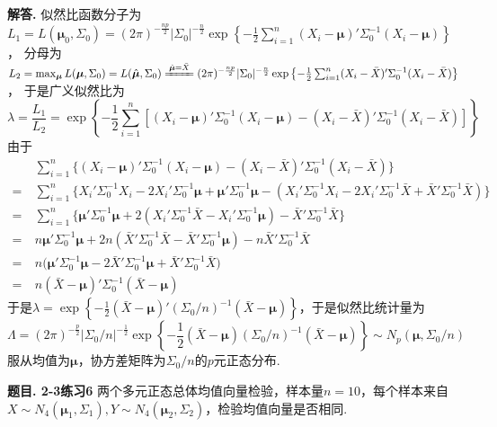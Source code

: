 \documentclass[12pt, a4paper, oneside]{ctexart}
\newcounter{problem}  %
\newenvironment{problem}[1][]{\stepcounter{problem}\par\noindent\textbf{题目\arabic{problem}. #1}}{\smallskip\par}
\newenvironment{solution}[1][]{\par\noindent\textbf{#1解答. }}{\smallskip\par}  %
\def\bd{\boldsymbol}        %
\def\add{\vspace{1ex}}      %
\begin{document}
\begin{solution}
    \add 似然比函数分子为$L_1 = L(\bd{\mu}_0, \Sigma_0) = (2\pi)^{-\frac{np}{2}}|\Sigma_0|^{-\frac{n}{2}}\exp\left\{-\frac{1}{2}\sum_{i=1}^n(X_i-\bd{\mu})'\Sigma_0^{-1}(X_i - \bd{\mu})\right\}$，
    分母为$L_2 = \max_{\bd{\mu}}L(\bd{\mu}, \Sigma_0) = L(\hat{\bd{\mu}}, \Sigma_0) \xlongequal{\hat{\bd{\mu}} = \bar{X}} (2\pi)^{-\frac{np}{2}}|\Sigma_0|^{-\frac{n}{2}}\exp\left\{-\frac{1}{2}\sum_{i=1}^n(X_i-\bar{X})'\Sigma_0^{-1}(X_i - \bar{X})\right\}$，
    于是广义似然比为
    \begin{equation*}
        \lambda = \frac{L_1}{L_2} = \exp\left\{-\frac{1}{2}\sum_{i=1}^n[(X_i-\bd{\mu})'\Sigma_0^{-1}(X_i - \bd{\mu}) - (X_i-\bar{X})'\Sigma_0^{-1}(X_i - \bar{X})]\right\}
    \end{equation*}
    由于
    \begin{align*}
        &\ \sum_{i=1}^n\bigg\{(X_i-\bd{\mu})'\Sigma_0^{-1}(X_i - \bd{\mu}) - (X_i-\bar{X})'\Sigma_0^{-1}(X_i - \bar{X})\bigg\}\\
        =&\ \sum_{i=1}^n\bigg\{X_i'\Sigma_0^{-1}X_i - 2X_i'\Sigma_0^{-1}\bd{\mu} + \bd{\mu}'\Sigma_0^{-1}\bd{\mu} - \left(X_i'\Sigma_0^{-1}X_i-2X_i'\Sigma_0^{-1}\bar{X}+\bar{X}'\Sigma_0^{-1}\bar{X}\right)\bigg\}\\
        =&\ \sum_{i=1}^n\bigg\{\bd{\mu}'\Sigma_0^{-1}\bd{\mu}+2(X_i'\Sigma_0^{-1}\bar{X}-X_i'\Sigma_0^{-1}\bd{\mu})-\bar{X}'\Sigma_0^{-1}\bar{X}\bigg\}\\
        =&\ n\bd{\mu}'\Sigma_0^{-1}\bd{\mu}+2n(\bar{X}'\Sigma_0^{-1}\bar{X}-\bar{X}'\Sigma_0^{-1}\bd{\mu})-n\bar{X}'\Sigma_0^{-1}\bar{X}\\
        =&\ n\bigg(\bd{\mu}'\Sigma_0^{-1}\bd{\mu}-2\bar{X}'\Sigma_0^{-1}\bd{\mu}+\bar{X}'\Sigma_0^{-1}\bar{X}\bigg)\\
        =&\ n(\bar{X}-\bd{\mu})'\Sigma_0^{-1}(\bar{X}-\bd{\mu})
    \end{align*}
    于是$\lambda = \exp\left\{-\frac{1}{2}(\bar{X}-\bd{\mu})'(\Sigma_0/n)^{-1}(\bar{X}-\bd{\mu})\right\}$，于是似然比统计量为
    \begin{equation*}
        \Lambda = (2\pi)^{-\frac{p}{2}}|\Sigma_0/n|^{-\frac{1}{2}}\exp\left\{-\frac{1}{2}(\bar{X}-\bd{\mu})(\Sigma_0/n)^{-1}(\bar{X}-\bd{\mu})\right\}\sim N_p(\bd{\mu}, \Sigma_0/n)
    \end{equation*}
    服从均值为$\bd{\mu}$，协方差矩阵为$\Sigma_0/n$的$p$元正态分布.
\end{solution}
\begin{problem}[2-3练习6]
    两个多元正态总体均值向量检验，样本量$n=10$，每个样本来自$X\sim N_4(\bd{\mu}_1,\Sigma_1),Y\sim N_4(\bd{\mu}_2,\Sigma_2)$，检验均值向量是否相同.
\end{problem}
\end{document}

